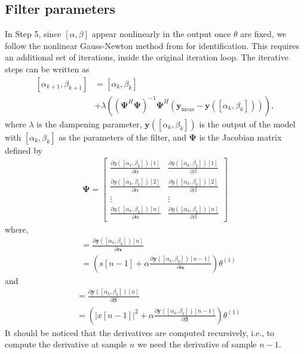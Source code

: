 \documentclass[journal]{IEEEtran}
\begin{document}
\subsection{Filter parameters}
In Step 5, since $[\alpha,\beta]$ appear nonlinearly in the output once $\theta$ are fixed, we follow the nonlinear Gauss-Newton method from \cite[p. 260]{kay} for identification. This requires an additional set of iterations, inside the original iteration loop. The iterative steps can be written as
\begin{align}
\nonumber [\alpha_{k+1},\beta_{k+1}] &= [\alpha_{k},\beta_{k}]\\ &+\lambda\left(\left(\mathbf{\Psi}^H\mathbf{\Psi}\right)^{-1}\mathbf{\Psi}^H(\mathbf{y}_{\text{meas}}-\mathbf{y}([\alpha_{k},\beta_{k}]))\right),
\label{a}
\end{align}
where $\lambda$ is the dampening parameter, $\mathbf{y}([\alpha_{k},\beta_{k}])$ is the output of the model with $[\alpha_{k},\beta_{k}]$ as the parameters of the filter, and $\bm{\Psi}$ is the Jacobian matrix defined by
\begin{align}
\mathbf{\Psi} = \left[ \begin{array}{cc}
\frac{\partial{y([\alpha_{k},\beta_{k}])[1]}}{\partial{\alpha}} & \frac{\partial{y([\alpha_{k},\beta_{k}])[1]}}{\partial{\beta}}\\
\frac{\partial{y([\alpha_{k},\beta_{k}])[2]}}{\partial{\alpha}} & \frac{\partial{y([\alpha_{k},\beta_{k}])[2]}}{\partial{\beta}}\\
\vdots & \vdots \\
\frac{\partial{y([\alpha_{k},\beta_{k}])[n]}}{\partial{\alpha}} & \frac{\partial{y([\alpha_{k},\beta_{k}])[n]}}{\partial{\beta}}\end{array} \right]
\end{align}
where,
\begin{align}
\nonumber &= \frac{\partial \mathbf{y}([\alpha_{k},\beta_{k}])[n]}{\partial \mathbf{\alpha}} \\
& =\left(s[n-1] + \alpha\frac{\partial \mathbf{y}([\alpha_{k},\beta_{k}])[n-1]}{\partial \mathbf{\alpha}}\right)\theta^{(1)}
\end{align}
and
\begin{align}
\nonumber &= \frac{\partial \mathbf{y}([\alpha_{k},\beta_{k}])[n]}{\partial \mathbf{\beta}}  \\
&=\left(|x[n-1]|^2 + \alpha\frac{\partial \mathbf{y}([\alpha_{k},\beta_{k}])[n-1]}{\partial \mathbf{\beta}}\right)\theta^{(1)}
\end{align}
It should be noticed that the derivatives are computed recursively, i.e., to compute the derivative at sample $n$ we need the derivative of sample $n-1$.
\end{document}
